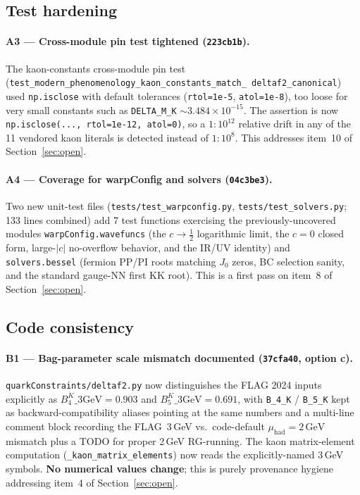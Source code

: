 \documentclass[11pt]{article}
\begin{document}
\subsection{Test hardening}
\label{sec:followup-tests}

\paragraph{A3 --- Cross-module pin test tightened
(\texttt{223cb1b}).}
The kaon-constants cross-module pin test
(\texttt{test\_modern\_phenomenology\_kaon\_constants\_match\_%
deltaf2\_canonical}) used \texttt{np.isclose} with default tolerances
(\texttt{rtol=1e-5}, \texttt{atol=1e-8}), too loose for very small
constants such as \texttt{DELTA\_M\_K} $\sim 3.484\times10^{-15}$.
The assertion is now \texttt{np.isclose(..., rtol=1e-12, atol=0)}, so a
$1\!:\!10^{12}$ relative drift in any of the 11 vendored kaon literals
is detected instead of $1\!:\!10^{8}$.  This addresses item~10 of
Section~\ref{sec:open}.

\paragraph{A4 --- Coverage for warpConfig and solvers
(\texttt{04c3be3}).}
Two new unit-test files (\texttt{tests/test\_warpconfig.py},
\texttt{tests/test\_solvers.py}; 133 lines combined) add 7
test functions exercising the previously-uncovered modules
\texttt{warpConfig.wavefuncs} (the $c \to \tfrac{1}{2}$ logarithmic
limit, the $c = 0$ closed form, large-$|c|$ no-overflow behavior, and
the IR/UV identity) and \texttt{solvers.bessel} (fermion PP/PI roots
matching $J_0$ zeros, BC selection sanity, and the standard gauge-NN
first KK root).  This is a first pass on item~8 of Section~\ref{sec:open}.

\subsection{Code consistency}
\label{sec:followup-code}

\paragraph{B1 --- Bag-parameter scale mismatch documented
(\texttt{37cfa40}, option c).}
\texttt{quarkConstraints/deltaf2.py} now distinguishes the FLAG 2024
inputs explicitly as $B_4^K\_3\mathrm{GeV} = 0.903$ and
$B_5^K\_3\mathrm{GeV} = 0.691$, with \texttt{B\_4\_K} / \texttt{B\_5\_K}
kept as backward-compatibility aliases pointing at the same numbers and
a multi-line comment block recording the FLAG~3\,GeV vs.\ code-default
$\mu_{\mathrm{had}} = 2\,\mathrm{GeV}$ mismatch plus a TODO for proper
2\,GeV RG-running.  The kaon matrix-element computation
(\texttt{\_kaon\_matrix\_elements}) now reads the explicitly-named
3\,GeV symbols.  \textbf{No numerical values change}; this is purely
provenance hygiene addressing item~4 of Section~\ref{sec:open}.
\end{document}
